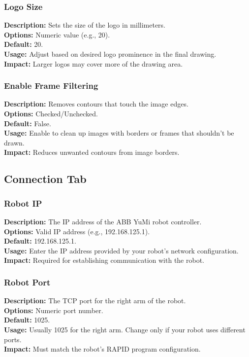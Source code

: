 \documentclass[a4paper,12pt]{article}
\begin{document}
\subsubsection{Logo Size}
\textbf{Description:} Sets the size of the logo in millimeters.\\
\textbf{Options:} Numeric value (e.g., 20).\\
\textbf{Default:} 20.\\
\textbf{Usage:} Adjust based on desired logo prominence in the final drawing.\\
\textbf{Impact:} Larger logos may cover more of the drawing area.

\subsubsection{Enable Frame Filtering}
\textbf{Description:} Removes contours that touch the image edges.\\
\textbf{Options:} Checked/Unchecked.\\
\textbf{Default:} False.\\
\textbf{Usage:} Enable to clean up images with borders or frames that shouldn't be drawn.\\
\textbf{Impact:} Reduces unwanted contours from image borders.

\subsection{Connection Tab}

\subsubsection{Robot IP}
\textbf{Description:} The IP address of the ABB YuMi robot controller.\\
\textbf{Options:} Valid IP address (e.g., 192.168.125.1).\\
\textbf{Default:} 192.168.125.1.\\
\textbf{Usage:} Enter the IP address provided by your robot's network configuration.\\
\textbf{Impact:} Required for establishing communication with the robot.

\subsubsection{Robot Port}
\textbf{Description:} The TCP port for the right arm of the robot.\\
\textbf{Options:} Numeric port number.\\
\textbf{Default:} 1025.\\
\textbf{Usage:} Usually 1025 for the right arm. Change only if your robot uses different ports.\\
\textbf{Impact:} Must match the robot's RAPID program configuration.
\end{document}
